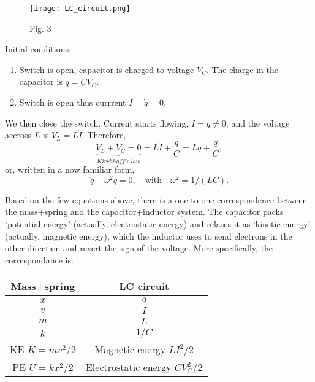 \documentclass[11pt]{article}
\makeatletter
\def\maxwidth{\ifdim\Gin@nat@width>\linewidth\linewidth
    \else\Gin@nat@width\fi}
\let\Oldincludegraphics\includegraphics
\renewcommand{\includegraphics}[1]{\Oldincludegraphics[width=.8\maxwidth]{#1}}
\makeatother
\begin{document}
    \begin{figure}
\centering
\texttt{[image: LC\_circuit.png]}
\caption{Fig. 3}
\end{figure}

    Initial conditions:

\begin{enumerate}
\def\labelenumi{\arabic{enumi}.}
\item
  Switch is open, capacitor is charged to voltage \(V_C\). The charge in
  the capacitor is \(q = CV_C\).
\item
  Switch is open thus currrent \(I=\dot{q} = 0\).
\end{enumerate}

    We then close the switch. Current starts flowing, \(I = \dot q \neq 0\),
and the voltage accross \(L\) is \(V_L = L \dot I\). Therefore,
\[ \underbrace{V_L+V_C = 0}_{Kirchhof\!f's\ law} = L\dot I + \frac{q}C  = L\ddot q + \frac{q}C, \]
or, written in a now familiar form,
\[ \boxed{\ddot q + \omega^2 q = 0, \quad \textrm{with}\quad \omega^2 = 1/(LC).} \]

    Based on the few equations above, there is a one-to-one correspondence
between the mass+spring and the capacitor+inductor system. The capacitor
packs `potential energy' (actually, electrostatic energy) and relases it
as `kinetic energy' (actually, magnetic energy), which the inductor uses
to send electrons in the other direction and revert the sign of the
voltage. More specifically, the correspondance is:

    \begin{longtable}[]{@{}cc@{}}
\toprule
Mass+spring & LC circuit\tabularnewline
\midrule
\endhead
\(x\) & \(q\)\tabularnewline
\(v\) & \(I\)\tabularnewline
\(m\) & \(L\)\tabularnewline
\(k\) & \(1/C\)\tabularnewline
KE \(K = mv^2/2\) & Magnetic energy \(LI^2/2\)\tabularnewline
PE \(U = kx^2/2\) & Electrostatic energy \(CV_C^2/2\)\tabularnewline
\bottomrule
\end{longtable}


    
    
    
    
\end{document}
